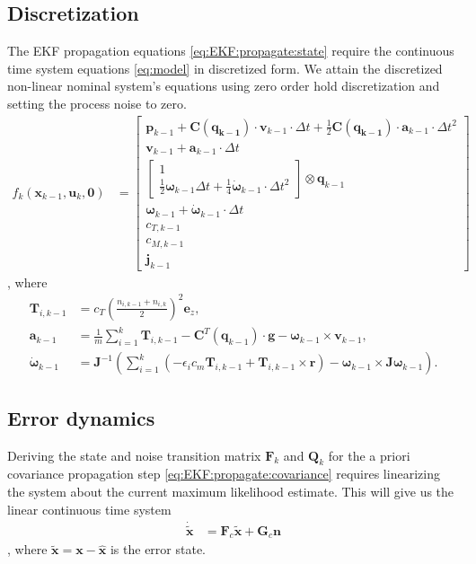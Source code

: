 \documentclass[10pt,a4paper]{article}
\begin{document}
\subsection*{Discretization}
The EKF propagation equations \ref{eq:EKF:propagate:state} require the continuous time system equations \ref{eq:model} in discretized form. We attain the discretized non-linear nominal system's equations using zero order hold discretization and setting the process noise to zero.
\begin{align}
f_k(\mathbf{x}_{k-1},\mathbf{u}_k, \mathbf{0}) &= \begin{bmatrix}
\mathbf{p}_{k-1} + \mathbf{C}(\mathbf{q_{k-1}}) \cdot \mathbf{v}_{k-1} \cdot \Delta t + \frac{1}{2} \mathbf{C}(\mathbf{q_{k-1}}) \cdot \mathbf{a}_{k-1} \cdot \Delta t ^2 \\
\mathbf{v}_{k-1} + \mathbf{a}_{k-1} \cdot \Delta t \\
\begin{bmatrix}
1 \\ \frac{1}{2} \boldsymbol{\omega}_{k-1} \Delta t + \frac{1}{4} \dot{\boldsymbol{\omega}}_{k-1} \cdot \Delta t ^2
\end{bmatrix} \otimes \mathbf{q}_{k-1} \\
\boldsymbol{\omega}_{k-1} + \dot{\boldsymbol{\omega}}_{k-1} \cdot \Delta t \\
c_{T,k-1} \\
c_{M,k-1} \\
\mathbf{j}_{k-1}
\end{bmatrix}
\end{align}
, where
\begin{align}
\mathbf{T}_{i,k-1} &= c_T \left( \frac{n_{i,k-1} + n_{i,k}}{2} \right) ^2 \mathbf{e}_z, \\
\mathbf{a}_{k-1} &= \frac{1}{m} \sum_{i=1}^k \mathbf{T}_{i,k-1}  - \mathbf{C}^T(\mathbf{q}_{k-1}) \cdot \mathbf{g} - \boldsymbol{\omega}_{k-1} \times \mathbf{v}_{k-1},  \\
\dot{\boldsymbol{\omega}}_{k-1} &= \mathbf{J}^{-1} \left(  \sum_{i=1}^k \left(-\epsilon_i  c_m \mathbf{T}_{i,k-1} + \mathbf{T}_{i,k-1} \times \mathbf{r} \right) - \boldsymbol{\omega}_{k-1} \times \mathbf{J} \boldsymbol{\omega}_{k-1} \right).
\end{align}

\subsection*{Error dynamics}
Deriving the state and noise transition matrix $\mathbf{F}_k$ and $\mathbf{Q}_k$ for the a priori covariance propagation step \ref{eq:EKF:propagate:covariance} requires linearizing the system about the current maximum likelihood estimate. This will give us the linear continuous time system
\begin{align}
\dot{\tilde{\mathbf{x}}} &= \mathbf{F}_c \tilde{\mathbf{x}} + \mathbf{G}_c \mathbf{n}
\end{align}
, where $\tilde{\mathbf{x}} = \mathbf{x} - \hat{\mathbf{x}}$ is the error state. 
\end{document}
